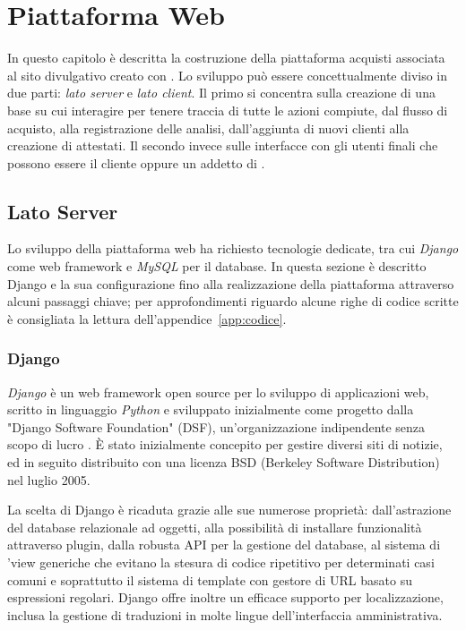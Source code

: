 \chapter{Piattaforma Web}
\label{chp:sviluppo}
In questo capitolo è descritta la costruzione della piattaforma acquisti associata al sito divulgativo creato con {\wp}. Lo sviluppo può essere concettualmente diviso in due parti: \emph{lato server} e \emph{lato client}. Il primo si concentra sulla creazione di una base su cui interagire per tenere traccia di tutte le azioni compiute, dal flusso di acquisto, alla registrazione delle analisi, dall'aggiunta di nuovi clienti alla creazione di attestati. Il secondo invece sulle interfacce con gli utenti finali che possono essere il cliente oppure un addetto di {\fem}.

\section{Lato Server}
\label{sec:server}
Lo sviluppo della piattaforma web ha richiesto tecnologie dedicate, tra cui \emph{Django} come web framework e \emph{MySQL} per il database. In questa sezione è descritto Django e la sua configurazione fino alla realizzazione della piattaforma attraverso alcuni passaggi chiave; per approfondimenti riguardo alcune righe di codice scritte è consigliata la lettura dell'appendice~\ref{app:codice}.

\subsection{Django}
\label{subs:django}
\emph{Django} è un web framework open source per lo sviluppo di applicazioni web, scritto in linguaggio \emph{Python} e sviluppato inizialmente come progetto dalla "Django Software Foundation" (DSF), un'organizzazione indipendente senza scopo di lucro \cite{django}. È stato inizialmente concepito per gestire diversi siti di notizie, ed in seguito distribuito con una licenza BSD (Berkeley Software Distribution) nel luglio 2005.

La scelta di Django è ricaduta grazie alle sue numerose proprietà: dall'astrazione del database relazionale ad oggetti, alla
possibilità di installare funzionalità attraverso plugin, dalla robusta API per la gestione del database, al sistema di 'view generiche che evitano la stesura di codice ripetitivo per determinati casi comuni e soprattutto il sistema di template con gestore di URL basato su espressioni regolari. Django offre inoltre un efficace supporto per localizzazione, inclusa la gestione di traduzioni in molte lingue dell'interfaccia amministrativa.

